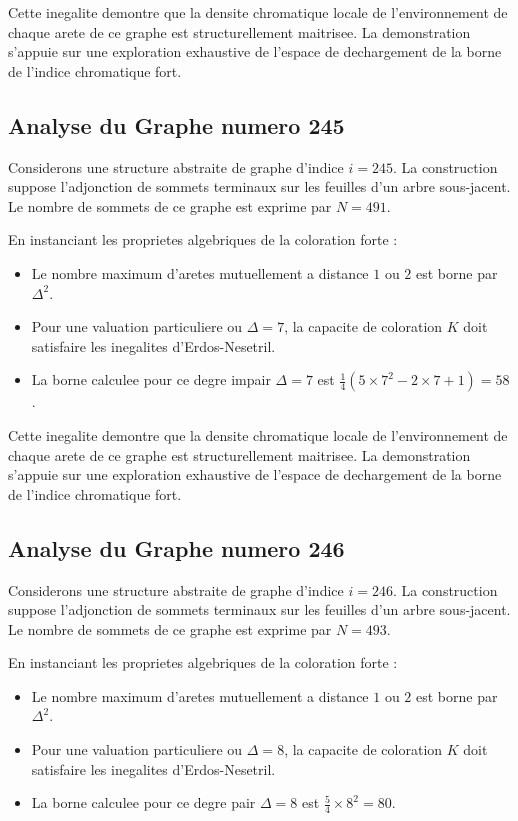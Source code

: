 \documentclass[11pt,a4paper]{article}
\begin{document}
Cette inegalite demontre que la densite chromatique locale de l'environnement de chaque arete de ce graphe est structurellement maitrisee. La demonstration s'appuie sur une exploration exhaustive de l'espace de dechargement de la borne de l'indice chromatique fort.

\subsection{Analyse du Graphe numero 245}
Considerons une structure abstraite de graphe d'indice $i = 245$. La construction suppose l'adjonction de sommets terminaux sur les feuilles d'un arbre sous-jacent. Le nombre de sommets de ce graphe est exprime par $N = 491$.

En instanciant les proprietes algebriques de la coloration forte :
\begin{itemize}
\item Le nombre maximum d'aretes mutuellement a distance $1$ ou $2$ est borne par $\Delta^2$.
\item Pour une valuation particuliere ou $\Delta = 7$, la capacite de coloration $K$ doit satisfaire les inegalites d'Erdos-Nesetril.
\item La borne calculee pour ce degre impair $\Delta = 7$ est $\frac{1}{4}(5 \times 7^2 - 2 \times 7 + 1) = 58$.
\end{itemize}

Cette inegalite demontre que la densite chromatique locale de l'environnement de chaque arete de ce graphe est structurellement maitrisee. La demonstration s'appuie sur une exploration exhaustive de l'espace de dechargement de la borne de l'indice chromatique fort.

\subsection{Analyse du Graphe numero 246}
Considerons une structure abstraite de graphe d'indice $i = 246$. La construction suppose l'adjonction de sommets terminaux sur les feuilles d'un arbre sous-jacent. Le nombre de sommets de ce graphe est exprime par $N = 493$.

En instanciant les proprietes algebriques de la coloration forte :
\begin{itemize}
\item Le nombre maximum d'aretes mutuellement a distance $1$ ou $2$ est borne par $\Delta^2$.
\item Pour une valuation particuliere ou $\Delta = 8$, la capacite de coloration $K$ doit satisfaire les inegalites d'Erdos-Nesetril.
\item La borne calculee pour ce degre pair $\Delta = 8$ est $\frac{5}{4} \times 8^2 = 80$.
\end{itemize}
\end{document}
